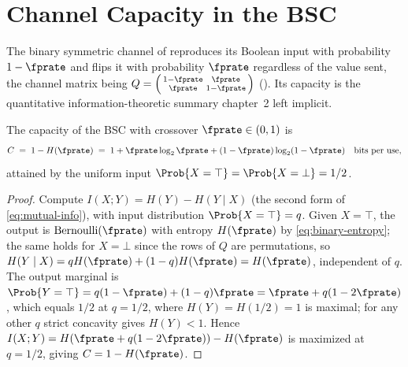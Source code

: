 %

\section{Channel Capacity in the BSC}
\label{sec:bsc-capacity}

The binary symmetric channel of  reproduces its Boolean input
with probability $1 - \fprate$ and flips it with probability $\fprate$
regardless of the value sent, the channel matrix being $Q =
\left(\begin{smallmatrix} 1 - \fprate & \fprate \\ \fprate & 1 - \fprate
\end{smallmatrix}\right)$ (). Its capacity is the quantitative
information-theoretic summary chapter~2 left implicit.

\begin{proposition}
\label{prop:bsc-capacity}
The capacity of the BSC with crossover $\fprate \in (0, 1)$ is
\begin{equation}
\label{eq:bsc-capacity}
  C \;=\; 1 - H(\fprate)
  \;=\; 1 + \fprate \log_2 \fprate + (1 - \fprate)\log_2(1 - \fprate)
  \quad \text{bits per use,}
\end{equation}
attained by the uniform input $\Prob{X = \top} = \Prob{X = \bot} = 1/2$.
\end{proposition}

\begin{proof}
Compute $I(X; Y) = H(Y) - H(Y \mid X)$ (the second form of
\eqref{eq:mutual-info}), with input distribution $\Prob{X = \top} = q$. Given
$X = \top$, the output is $\mathrm{Bernoulli}(\fprate)$ with entropy
$H(\fprate)$ by \eqref{eq:binary-entropy}; the same holds for $X = \bot$ since
the rows of $Q$ are permutations, so $H(Y \mid X) = q H(\fprate) + (1 - q)
H(\fprate) = H(\fprate)$, independent of $q$. The output marginal is
$\Prob{Y = \top} = q(1 - \fprate) + (1 - q)\fprate = \fprate + q(1 - 2\fprate)$,
which equals $1/2$ at $q = 1/2$, where $H(Y) = H(1/2) = 1$ is maximal; for any
other $q$ strict concavity gives $H(Y) < 1$. Hence $I(X; Y) = H(\fprate +
q(1 - 2\fprate)) - H(\fprate)$ is maximized at $q = 1/2$, giving $C = 1 -
H(\fprate)$.
\end{proof}

